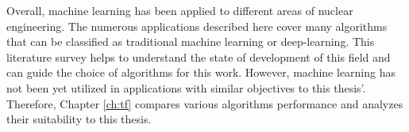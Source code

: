 
Overall, machine learning has been applied to different areas of nuclear engineering.
The numerous applications described here cover many algorithms that can be classified as traditional machine learning or deep-learning.
This literature survey helps to understand the state of development of this field and can guide the choice of algorithms for this work.
However, machine learning has not been yet utilized in applications with similar objectives to this thesis'.
Therefore, Chapter \ref{ch:tf} compares various algorithms performance and analyzes their suitability to this thesis.
